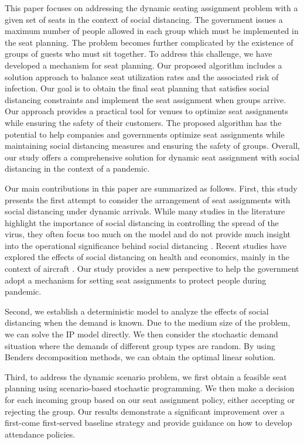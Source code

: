 This paper focuses on addressing the dynamic seating assignment problem with a given set of seats in the context of social distancing. The government issues a maximum number of people allowed in each group which must be implemented in the seat planning. The problem becomes further complicated by the existence of groups of guests who must sit together. To address this challenge, we have developed a mechanism for seat planning. Our proposed algorithm includes a solution approach to balance seat utilization rates and the associated risk of infection. Our goal is to obtain the final seat planning that satisfies social distancing constraints and implement the seat assignment when groups arrive. Our approach provides a practical tool for venues to optimize seat assignments while ensuring the safety of their customers. The proposed algorithm has the potential to help companies and governments optimize seat assignments while maintaining social distancing measures and ensuring the safety of groups. Overall, our study offers a comprehensive solution for dynamic seat assignment with social distancing in the context of a pandemic.


Our main contributions in this paper are summarized as follows. First, this study presents the first attempt to consider the arrangement of seat assignments with social distancing under dynamic arrivals. While many studies in the literature highlight the importance of social distancing in controlling the spread of the virus, they often focus too much on the model and do not provide much insight into the operational significance behind social distancing \cite{barry2021optimal, fischetti2021safe}. Recent studies have explored the effects of social distancing on health and economics, mainly in the context of aircraft \cite{salari2020social, ghorbani2020model, salari2022social}. Our study provides a new perspective to help the government adopt a mechanism for setting seat assignments to protect people during pandemic.

Second, we establish a deterministic model to analyze the effects of social distancing when the demand is known. Due to the medium size of the problem, we can solve the IP model directly. We then consider the stochastic demand situation where the demands of different group types are random. By using Benders decomposition methods, we can obtain the optimal linear solution.

Third, to address the dynamic scenario problem, we first obtain a feasible seat planning using scenario-based stochastic programming. We then make a decision for each incoming group based on our seat assignment policy, either accepting or rejecting the group. Our results demonstrate a significant improvement over a first-come first-served baseline strategy and provide guidance on how to develop attendance policies.


